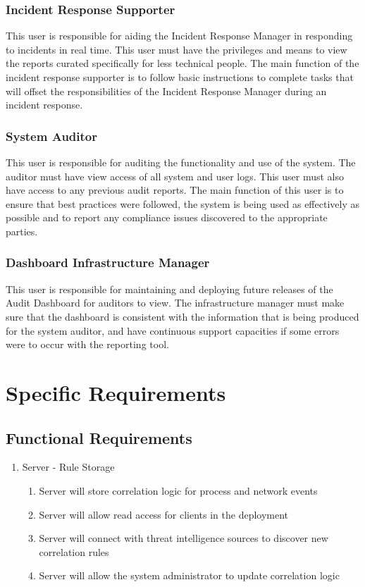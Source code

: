 \documentclass{scrreprt}
\begin{document}
\subsection{Incident Response Supporter}

This user is responsible for aiding the Incident Response Manager in responding to incidents in real time. This user must have the privileges and means to view the reports curated specifically for less technical people. The main function of the incident response supporter is to follow basic instructions to complete tasks that will offset the responsibilities of the Incident Response Manager during an incident response. 

\subsection{System Auditor}

This user is responsible for auditing the functionality and use of the system. The auditor must have view access of all system and user logs. This user must also have access to any previous audit reports. The main function of this user is to ensure that best practices were followed, the system is being used as effectively as possible and to report any compliance issues discovered to the appropriate parties.

\subsection{Dashboard Infrastructure Manager}

This user is responsible for maintaining and deploying future releases of the Audit Dashboard for auditors to view. The infrastructure manager must make sure that the dashboard is consistent with the information that is being produced for the system auditor, and have continuous support capacities if some errors were to occur with the reporting tool.

\chapter{Specific Requirements}

\section{Functional Requirements}

\begin{enumerate}[label*=R\arabic*.]
    \item Server - Rule Storage
    \begin{enumerate}[label*=\arabic*.]
          \item Server will store correlation logic for process and network events
	\item Server will allow read access for clients in the deployment
	\item Server will connect with threat intelligence sources to discover new correlation rules
	\item Server will allow the system administrator to update correlation logic
    \end{enumerate}
\end{enumerate}
\end{document}
